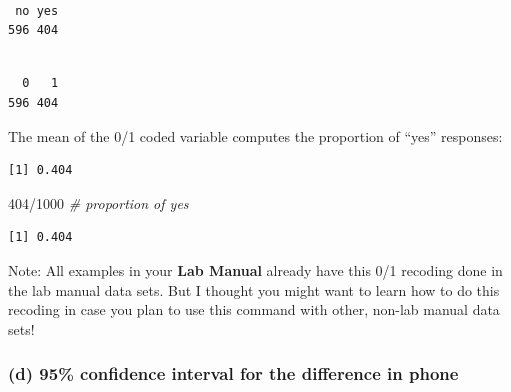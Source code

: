 \documentclass[
]{book}
\newenvironment{Shaded}{\begin{snugshade}}{\end{snugshade}}
\newcommand{\CommentTok}[1]{\textcolor[rgb]{0.56,0.35,0.01}{\textit{#1}}}
\newcommand{\DecValTok}[1]{\textcolor[rgb]{0.00,0.00,0.81}{#1}}
\newcommand{\FunctionTok}[1]{\textcolor[rgb]{0.00,0.00,0.00}{#1}}
\newcommand{\NormalTok}[1]{#1}
\newcommand{\SpecialCharTok}[1]{\textcolor[rgb]{0.00,0.00,0.00}{#1}}
\begin{document}
\begin{verbatim}

 no yes 
596 404 
\end{verbatim}

\begin{Shaded}
\end{Shaded}

\begin{verbatim}

  0   1 
596 404 
\end{verbatim}

The mean of the 0/1 coded variable computes the proportion of ``yes'' responses:

\begin{Shaded}
\end{Shaded}

\begin{verbatim}
[1] 0.404
\end{verbatim}

\begin{Shaded}
\begin{Highlighting}[]
\DecValTok{404}\SpecialCharTok{/}\DecValTok{1000}  \CommentTok{\# proportion of yes}
\end{Highlighting}
\end{Shaded}

\begin{verbatim}
[1] 0.404
\end{verbatim}

Note: All examples in your \textbf{Lab Manual} already have this 0/1 recoding done in the lab manual data sets. But I thought you might want to learn how to do this recoding in case you plan to use this command with other, non-lab manual data sets!

\hypertarget{d-95-confidence-interval-for-the-difference-in-phone}{%
\subsubsection{(d) 95\% confidence interval for the difference in phone}\label{d-95-confidence-interval-for-the-difference-in-phone}}
\end{document}
